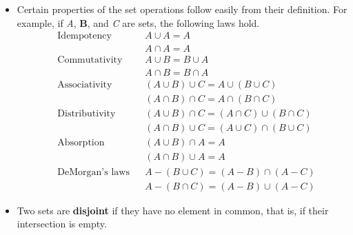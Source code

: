 \documentclass{article}
\newcounter{example}
\newcounter{definition}
\begin{document}
\begin{itemize}
    \item Certain properties of the set operations follow easily from their definition. For example, if \textit{A}, \textbf{B}, and \textit{C} are sets, the following laws hold.
        \begin{align*}
            &\text{Idempotency}         &&A \cup A = A\\
            &                           &&A \cap A = A\\
            &\text{Commutativity}       &&A \cup B = B \cup A\\
            &                           &&A \cap B = B \cap A\\
            &\text{Associativity}       &&(A \cup B) \cup C = A \cup (B \cup C)\\
            &                           &&(A \cap B) \cap C = A \cap (B \cap C)\\
            &\text{Distributivity}      &&(A \cup B) \cap C = (A \cap C) \cup (B \cap C)\\
            &                           &&(A \cap B) \cup C = (A \cup C) \cap (B \cup C)\\
            &\text{Absorption}          &&(A \cup B) \cap A = A\\
            &                           &&(A \cap B) \cup A = A\\
            &\text{DeMorgan's laws}     &&A - (B \cup C) = (A - B) \cap (A - C)\\
            &                           &&A - (B \cap C) = (A - B) \cup (A - C)
        \end{align*}
    \item Two sets are \textbf{disjoint} if they have no element in common, that is, if their intersection is empty.
\end{itemize}
\end{document}

